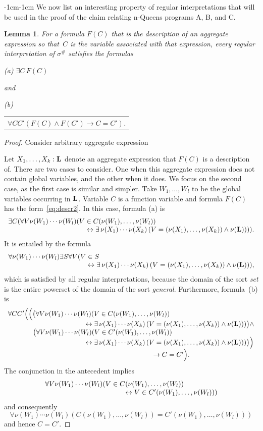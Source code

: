 \documentclass[11pt]{article}
\newtheorem{lemma}{Lemma}
\def\lrar{\leftrightarrow}
\def\ba{\begin{array}}
\def\ea{\end{array}}
\begin{document}
\begin{adjustwidth}{-1cm}{-1cm}
We now list an interesting property of regular interpretations that will be used in the proof of the claim relating n-Queens programs A, B, and C.
\begin{lemma}\label{lem:eu-general}
  For a formula $F(C)$  that is the description of an aggregate expression so that~$C$ is the variable associated with that expression, every regular interpretation of $\sigma^\#$ satisfies the formulas
 \medskip
 
 (a) $\exists C\,F(C)$

 \medskip\noindent and

 \medskip
 (b)
 \begin{tabular}{l} 
  $\forall C C'(F(C)\land F(C') \to C=C')$.
\end{tabular}
\end{lemma}

\begin{proof}
Consider arbitrary aggregate expression

Let  $X_1,\dots,X_k :{\bf L}$ denote an aggregate expression that $F(C)$ is a description of.
There are two cases to consider. One when this aggregate expression does not contain global variables, and the other when it does. We focus on the second case, as the first case is similar and simpler.
Take $W_1,\dots,W_l$ to be the global variables occurring in ${\bf L}$. Variable  $C$ is a function variable and formula $F(C)$ has the form~\eqref{eq:descr2}.
In this case, formula (a) is
$$
\ba l
\exists C(
  \forall V \nu(W_1) \cdots \nu(W_l)(V\in C(\nu(W_1),\dots,\nu(W_l))\\
\hskip 4cm\lrar
\exists\, \nu(X_1)\cdots\nu(X_k)\,(V=(\nu(X_1),\dots,\nu(X_k))
\land \nu({\bf L}))) ).
\ea
$$    
It is entailed by the formula
$$
\ba l
\forall \nu(W_1) \cdots \nu(W_l) \exists S \forall V (V\in S 
\\
\hskip 4cm\lrar
\exists\, \nu(X_1)\cdots\nu(X_k)\,(V=(\nu(X_1),\dots,\nu(X_k))
\land \nu({\bf L}))),
\ea
$$
which is satisfied by all regular interpretations, because the domain of
the sort \emph{set} is the entire powerset of the domain of the sort
\emph{general}.  
Furthermore, formula~(b) is
$$\ba l
\forall C C'\Big( \Big( \big(
 \forall V \nu(W_1) \cdots \nu(W_l)(V\in C(\nu(W_1),\dots,\nu(W_l))\\
\hskip 4cm\lrar
\exists\, \nu(X_1)\cdots\nu(X_k)\,(V=(\nu(X_1),\dots,\nu(X_k))
\land \nu({\bf L}))) \big)  \wedge\\
\ \ \ \ \ \ \ \  \ \ \  \big(\forall V \nu(W_1) \cdots \nu(W_l)(V\in C'(\nu(W_1),\dots,\nu(W_l))\\
\hskip 4cm\lrar
\exists\, \nu(X_1)\cdots\nu(X_k)\,(V=(\nu(X_1),\dots,\nu(X_k))
\land \nu({\bf L})))\big)\Big)\\
\hskip 7.5cm
\to C=C'\Big).
\ea
$$
The conjunction in the antecedent implies
$$
\ba l
\forall V \nu(W_1) \cdots \nu(W_l) (V\in C(\nu(W_1),\dots,\nu(W_l))\\
\hskip 4cm\lrar
V\in C'(\nu(W_1),\dots,\nu(W_l)))
\ea
$$
and consequently
$$
\forall \nu(W_1) \cdots \nu(W_l) (C(\nu(W_1),\dots,\nu(W_l))= C'(\nu(W_1),\dots,\nu(W_l)))
$$
and hence $C=C'$.
\end{proof}



\end{adjustwidth}
\end{document}
